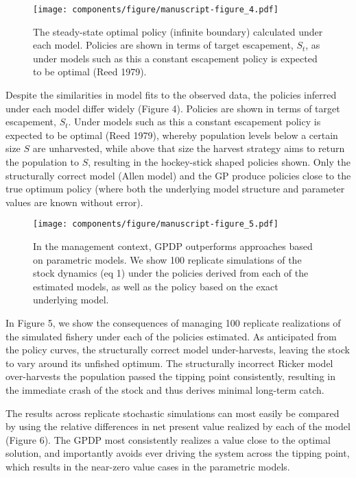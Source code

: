 \documentclass[author-year, 12pt,review]{components/elsarticle} %
\makeatletter
\def\maxwidth{\ifdim\Gin@nat@width>\linewidth\linewidth
\else\Gin@nat@width\fi}
\let\Oldincludegraphics\includegraphics
\renewcommand{\includegraphics}[1]{\Oldincludegraphics[width=\maxwidth]{#1}}
\makeatother
\begin{document}
\begin{figure}[htbp]
\centering
\texttt{[image: components/figure/manuscript-figure\_4.pdf]}
\caption{The steady-state optimal policy (infinite boundary) calculated
under each model. Policies are shown in terms of target escapement,
$S_t$, as under models such as this a constant escapement policy is
expected to be optimal (Reed 1979).}
\end{figure}

Despite the similarities in model fits to the observed data, the
policies inferred under each model differ widely (Figure 4). Policies
are shown in terms of target escapement, $S_t$. Under models such as
this a constant escapement policy is expected to be optimal (Reed 1979),
whereby population levels below a certain size $S$ are unharvested,
while above that size the harvest strategy aims to return the population
to $S$, resulting in the hockey-stick shaped policies shown. Only the
structurally correct model (Allen model) and the GP produce policies
close to the true optimum policy (where both the underlying model
structure and parameter values are known without error).

\begin{figure}[htbp]
\centering
\texttt{[image: components/figure/manuscript-figure\_5.pdf]}
\caption{In the management context, GPDP outperforms approaches based on
parametric models. We show 100 replicate simulations of the stock
dynamics (eq 1) under the policies derived from each of the estimated
models, as well as the policy based on the exact underlying model.}
\end{figure}

In Figure 5, we show the consequences of managing 100 replicate
realizations of the simulated fishery under each of the policies
estimated. As anticipated from the policy curves, the structurally
correct model under-harvests, leaving the stock to vary around its
unfished optimum. The structurally incorrect Ricker model over-harvests
the population passed the tipping point consistently, resulting in the
immediate crash of the stock and thus derives minimal long-term catch.

The results across replicate stochastic simulations can most easily be
compared by using the relative differences in net present value realized
by each of the model (Figure 6). The GPDP most consistently realizes a
value close to the optimal solution, and importantly avoids ever driving
the system across the tipping point, which results in the near-zero
value cases in the parametric models.
\end{document}
